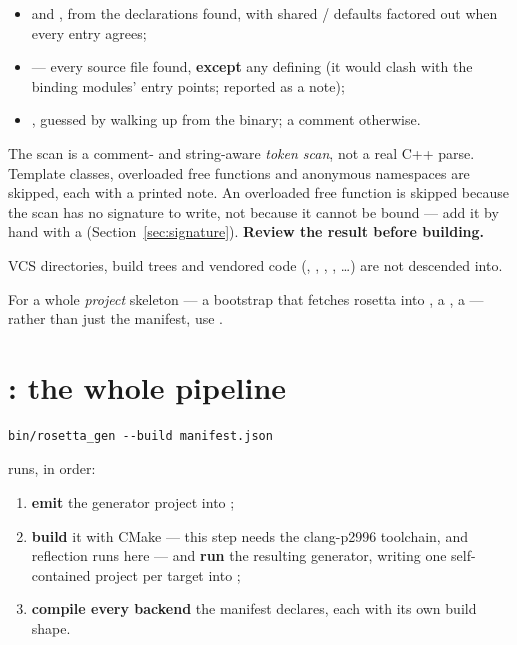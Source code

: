 \begin{itemize}
  \item {} and , from the declarations found, with
    shared  /  defaults factored out when
    every entry agrees;
  \item {} --- every source file found, \textbf{except} any
    defining  (it would clash with the binding modules' entry
    points; reported as a note);
  \item {}, guessed by walking up from the
     binary; a  comment otherwise.
\end{itemize}

\begin{warn}
The scan is a comment- and string-aware \emph{token scan}, not a real C++ parse.
Template classes, overloaded free functions and anonymous namespaces are
skipped, each with a printed note. An overloaded free function is skipped
because the scan has no signature to write, not because it cannot be bound ---
add it by hand with a  (Section~\ref{sec:signature}).
\textbf{Review the result before building.}
\end{warn}

VCS directories, build trees and vendored code (, ,
, , \ldots) are not descended into.

\begin{note}
For a whole \emph{project} skeleton --- a bootstrap  that
fetches rosetta into , a , a  ---
rather than just the manifest, use .
\end{note}

\section{: the whole pipeline}

\begin{lstlisting}[style=sh]
bin/rosetta_gen --build manifest.json
\end{lstlisting}

runs, in order:

\begin{enumerate}
  \item \textbf{emit} the generator project into ;
  \item \textbf{build} it with CMake --- this step needs the clang-p2996
    toolchain, and reflection runs here --- and \textbf{run} the resulting
    generator, writing one self-contained project per target into
    ;
  \item \textbf{compile every backend} the manifest declares, each with its own
    build shape.
\end{enumerate}

